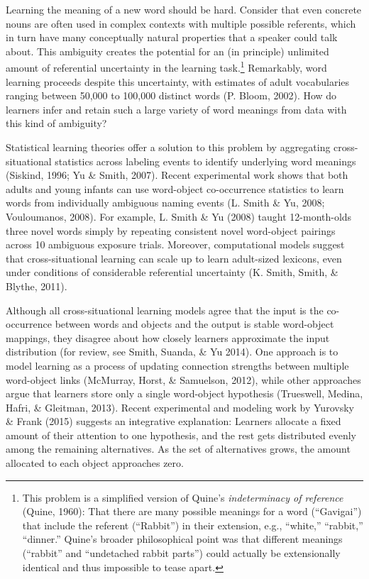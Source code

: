 \documentclass[authoryear, review]{elsarticle}
\begin{document}
Learning the meaning of a new word should be hard. Consider that even
concrete nouns are often used in complex contexts with multiple possible
referents, which in turn have many conceptually natural properties that
a speaker could talk about. This ambiguity creates the potential for an
(in principle) unlimited amount of referential uncertainty in the
learning task.\footnote{This problem is a simplified version of Quine's
  \textit{indeterminacy of reference} (Quine, 1960): That there are many
  possible meanings for a word (``Gavigai'') that include the referent
  (``Rabbit'') in their extension, e.g., ``white,'' ``rabbit,''
  ``dinner.'' Quine's broader philosophical point was that different
  meanings (``rabbit'' and ``undetached rabbit parts'') could actually
  be extensionally identical and thus impossible to tease apart.}
Remarkably, word learning proceeds despite this uncertainty, with
estimates of adult vocabularies ranging between 50,000 to 100,000
distinct words (P. Bloom, 2002). How do learners infer and retain such a
large variety of word meanings from data with this kind of ambiguity?

Statistical learning theories offer a solution to this problem by
aggregating cross-situational statistics across labeling events to
identify underlying word meanings (Siskind, 1996; Yu \& Smith, 2007).
Recent experimental work shows that both adults and young infants can
use word-object co-occurrence statistics to learn words from
individually ambiguous naming events (L. Smith \& Yu, 2008; Vouloumanos,
2008). For example, L. Smith \& Yu (2008) taught 12-month-olds three
novel words simply by repeating consistent novel word-object pairings
across 10 ambiguous exposure trials. Moreover, computational models
suggest that cross-situational learning can scale up to learn
adult-sized lexicons, even under conditions of considerable referential
uncertainty (K. Smith, Smith, \& Blythe, 2011).

Although all cross-situational learning models agree that the input is
the co-occurrence between words and objects and the output is stable
word-object mappings, they disagree about how closely learners
approximate the input distribution (for review, see Smith, Suanda, \& Yu
2014). One approach is to model learning as a process of updating
connection strengths between multiple word-object links (McMurray,
Horst, \& Samuelson, 2012), while other approaches argue that learners
store only a single word-object hypothesis (Trueswell, Medina, Hafri, \&
Gleitman, 2013). Recent experimental and modeling work by Yurovsky \&
Frank (2015) suggests an integrative explanation: Learners allocate a
fixed amount of their attention to one hypothesis, and the rest gets
distributed evenly among the remaining alternatives. As the set of
alternatives grows, the amount allocated to each object approaches zero.
\end{document}
